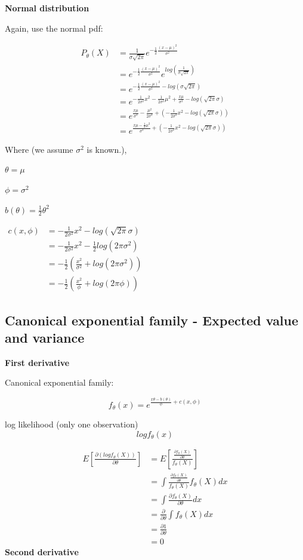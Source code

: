\documentclass[]{book}
\begin{document}
\textbf{Normal distribution}

Again, use the normal pdf:

\[\begin{aligned} P_{\theta}(X) &= \frac{1}{\sigma\sqrt{2\pi}} e^{-\frac{1}{2}\frac{(x-\mu)^2}{\sigma^2}}\\ &=e^{-\frac{1}{2}\frac{(x-\mu)^2}{\sigma^2}} e^{log(\frac{1}{\sigma\sqrt{2\pi}})} \\ &= e^{-\frac{1}{2}\frac{(x-\mu)^2}{\sigma^2}-log (\sigma\sqrt{2\pi})} \\ &= e^{-\frac{1}{2\sigma^2}x^2-\frac{1}{2\sigma^2} \mu^2+\frac{x\mu}{\sigma^2}-log(\sqrt{2\pi}\sigma)}\\ &= e^{\frac{x\mu}{\sigma^2}-\frac{\mu^2}{2\sigma^2}+(-\frac{1}{2\sigma^2}x^2-log(\sqrt{2\pi}\sigma)) } \\ &=e^{\frac{x\mu-\frac{1}{2}\mu^2}{\sigma^2}+(-\frac{1}{2\sigma^2}x^2-log(\sqrt{2\pi}\sigma)) } \end{aligned}\]

Where (we assume \(\sigma^2\) is known.),

\(\theta=\mu\)

\(\phi =\sigma^2\)

\(b(\theta)=\frac{1}{2}\theta^2\)

\(\begin{aligned} c(x, \phi) &=-\frac{1}{2\sigma^2}x^2-log(\sqrt{2\pi}\sigma) \\ &=-\frac{1}{2\sigma^2}x^2-\frac{1}{2}log(2\pi\sigma^2) \\ &=-\frac{1}{2}(\frac{x^2}{\sigma^2}+log(2\pi\sigma^2)) \\ &=-\frac{1}{2}(\frac{x^2}{\phi}+log(2\pi \phi)) \end{aligned}\)

\subsection{Canonical exponential family - Expected value and
variance}\label{canonical-exponential-family---expected-value-and-variance}

\textbf{First derivative}

Canonical exponential family:

\[f_{\theta}(x)=e^{\frac{x\theta-b(\theta)}{\phi}+c(x,\phi)}\]

log likelihood (only one observation) \[log f_{\theta}(x)\]

\[\begin{aligned} E[\frac{\partial (logf_{\theta}(X))}{\partial \theta} ] &=E[\frac{\frac{\partial f_{\theta}(X)}{\partial \theta}}{f_{\theta}(X)}] \\ &= \int \frac{\frac{\partial f_{\theta}(X)}{\partial \theta}}{f_{\theta}(X)} f_{\theta}(X) dx  \\ &= \int \frac{\partial f_{\theta}(X)}{\partial \theta} dx \\ &= \frac{\partial}{\partial \theta} \int f_{\theta}(X)dx \\ &= \frac{\partial 1}{\partial \theta} \\ &=0  \end{aligned}\]
\textbf{Second derivative}
\end{document}
